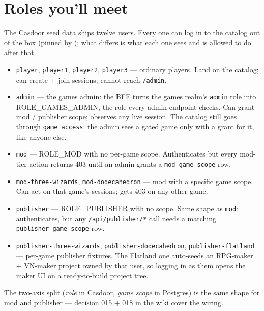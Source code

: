 \documentclass[11pt,a4paper,openany]{book}
\begin{document}
\chapter{Roles you'll meet}
The Casdoor seed data ships twelve users. Every one can log in to the
catalog out of the box (pinned by
); what differs is
what each one sees and is allowed to do after that.

\begin{itemize}
  \item \texttt{player}, \texttt{player1}, \texttt{player2},
        \texttt{player3} --- ordinary players. Land on the catalog;
        can create + join sessions; cannot reach \texttt{/admin}.
  \item \texttt{admin} --- the games admin: the BFF turns the games
        realm's \texttt{admin} role into ROLE\_GAMES\_ADMIN, the role
        every admin endpoint checks. Can grant mod / publisher scope;
        observes any live session. The catalog still goes through
        \texttt{game\_access}: the admin sees a gated game only with a
        grant for it, like anyone else.
  \item \texttt{mod} --- ROLE\_MOD with no per-game scope. Authenticates
        but every mod-tier action returns 403 until an admin grants a
        \texttt{mod\_game\_scope} row.
  \item \texttt{mod-three-wizards}, \texttt{mod-dodecahedron} --- mod
        with a specific game scope. Can act on that game's sessions;
        gets 403 on any other game.
  \item \texttt{publisher} --- ROLE\_PUBLISHER with no scope. Same
        shape as \texttt{mod}: authenticates, but any
        \texttt{/api/publisher/*} call needs a matching
        \texttt{publisher\_game\_scope} row.
  \item \texttt{publisher-three-wizards}, \texttt{publisher-dodecahedron},
        \texttt{publisher-flatland} --- per-game publisher fixtures.
        The Flatland one auto-seeds an RPG-maker + VN-maker project
        owned by that user, so logging in as them opens the maker UI
        on a ready-to-build project tree.
\end{itemize}

The two-axis split (\emph{role} in Casdoor, \emph{game scope} in
Postgres) is the same shape for mod and publisher --- decision 015 +
018 in the wiki cover the wiring.
\end{document}
